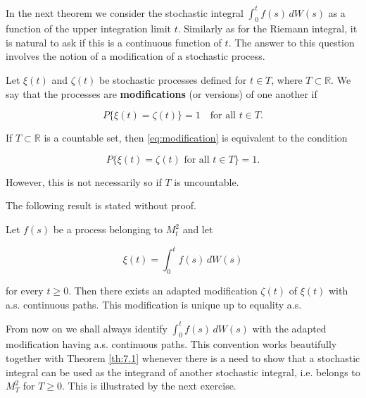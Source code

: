 In the next theorem we consider the stochastic integral $\int_0^t f(s) \, dW(s)$ as a function of the upper integration limit $t$. Similarly as for the Riemann integral, it is natural to ask if this is a continuous function of $t$. The answer to this question involves the notion of a modification of a stochastic process.

\begin{Definition}
\label{def:7.7}
Let $\xi(t)$ and $\zeta(t)$ be stochastic processes defined for $t \in T$, where $T \subset \mathbb{R}$. We say that the processes are \textbf{modifications} (or versions) of one another if

\begin{equation}
P\{\xi(t) = \zeta(t)\} = 1 \quad \text{for all } t \in T.
\label{eq:modification}
\end{equation}
\end{Definition}

\begin{Remark}
\label{rm:7.1}
If $T \subset \mathbb{R}$ is a countable set, then \eqref{eq:modification} is equivalent to the condition

\begin{equation}
P\{\xi(t) = \zeta(t) \text{ for all } t \in T\} = 1.
\end{equation}

However, this is not necessarily so if $T$ is uncountable.
\end{Remark}

The following result is stated without proof.

\begin{Theorem}
\label{th:7.4}
Let $f(s)$ be a process belonging to $M_t^2$ and let

\begin{equation}
\xi(t) = \int_0^t f(s) \, dW(s)
\end{equation}

for every $t \geq 0$. Then there exists an adapted modification $\zeta(t)$ of $\xi(t)$ with a.s. continuous paths. This modification is unique up to equality a.s.
\end{Theorem}

From now on we shall always identify $\int_0^t f(s) \, dW(s)$ with the adapted modification having a.s. continuous paths. This convention works beautifully together with Theorem \ref{th:7.1} whenever there is a need to show that a stochastic integral can be used as the integrand of another stochastic integral, i.e. belongs to $M_T^2$ for $T \geq 0$. This is illustrated by the next exercise.

